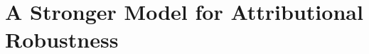 \documentclass[letterpaper]{article} %
\begin{document}

\section{A Stronger Model for Attributional Robustness} \label{sec:adv-robust} 
\end{document}
